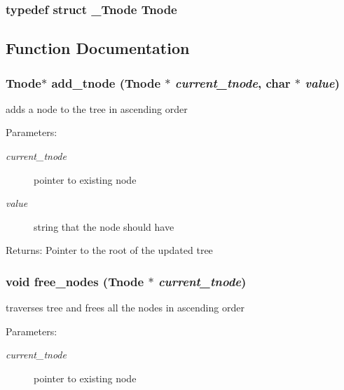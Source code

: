 \subsubsection{\setlength{\rightskip}{0pt plus 5cm}typedef struct \bf{\_\-Tnode} \bf{Tnode}}\label{tree_8h_0113664e9241bb4e9114718b5f9b9625}




\subsection{Function Documentation}
\subsubsection{\setlength{\rightskip}{0pt plus 5cm}\bf{Tnode}$\ast$ add\_\-tnode (\bf{Tnode} $\ast$ {\em current\_\-tnode}, char $\ast$ {\em value})}\label{tree_8h_0e09ab427d9f10182d2261a14b349f66}


adds a node to the tree in ascending order \begin{Desc}
\item[Parameters:]
\begin{description}
\item[{\em current\_\-tnode}]pointer to existing node \item[{\em value}]string that the node should have \end{description}
\end{Desc}
\begin{Desc}
\item[Returns:]Pointer to the root of the updated tree \end{Desc}
\subsubsection{\setlength{\rightskip}{0pt plus 5cm}void free\_\-nodes (\bf{Tnode} $\ast$ {\em current\_\-tnode})}\label{tree_8h_5ff3cf4a1ae4638168f0c003f04cc718}


traverses tree and frees all the nodes in ascending order \begin{Desc}
\item[Parameters:]
\begin{description}
\item[{\em current\_\-tnode}]pointer to existing node \end{description}
\end{Desc}

